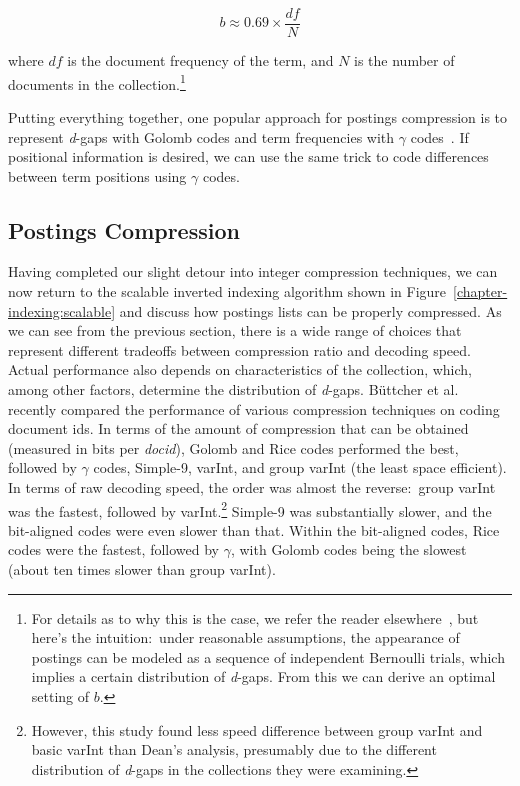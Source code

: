 \begin{equation}
b \approx 0.69 \times \frac{df}{N}
\end{equation}

\noindent where $df$ is the document frequency of the term, and $N$ is
the number of documents in the collection.\footnote{For details as to
  why this is the case, we refer the reader
  elsewhere~\cite{Witten_etal_1999}, but here's the intuition:\ under
  reasonable assumptions, the appearance of postings can be modeled as
  a sequence of independent Bernoulli trials, which implies a certain
  distribution of \emph{d}-gaps.  From this we can derive an optimal
  setting of $b$.}

Putting everything together, one popular approach for postings
compression is to represent \emph{d}-gaps with Golomb codes and term
frequencies with $\gamma$
codes~\cite{Witten_etal_1999,Zobel_Moffat_2006}.  If positional
information is desired, we can use the same trick to code differences
between term positions using $\gamma$ codes.

\subsection{Postings Compression}

Having completed our slight detour into integer compression
techniques, we can now return to the scalable inverted indexing
algorithm shown in Figure~\ref{chapter-indexing:scalable} and discuss
how postings lists can be properly compressed.  As we can see from the
previous section, there is a wide range of choices that represent
different tradeoffs between compression ratio and decoding speed.
Actual performance also depends on characteristics of the collection,
which, among other factors, determine the distribution of \emph{
  d}-gaps.  B\"uttcher et al.~\cite{Buttcher_etal_2010} recently
compared the performance of various compression techniques on coding
document ids.  In terms of the amount of compression that can be
obtained (measured in bits per \emph{docid}), Golomb and Rice codes
performed the best, followed by $\gamma$ codes, Simple-9, varInt, and
group varInt (the least space efficient).  In terms of raw decoding
speed, the order was almost the reverse:\ group varInt was the
fastest, followed by varInt.\footnote{However, this study found less
  speed difference between group varInt and basic varInt than Dean's
  analysis, presumably due to the different distribution of \emph{d}-gaps
  in the collections they were examining.}  Simple-9 was substantially
slower, and the bit-aligned codes were even slower than that.  Within
the bit-aligned codes, Rice codes were the fastest, followed by
$\gamma$, with Golomb codes being the slowest (about ten times slower
than group varInt).


